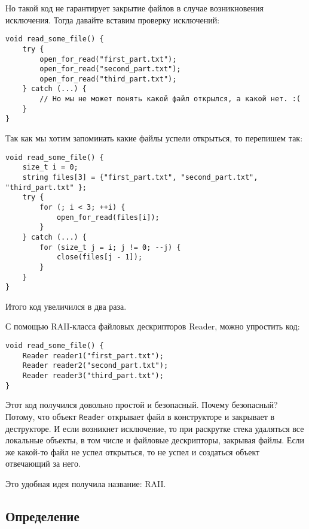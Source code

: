 
Но такой код не гарантирует закрытие файлов в случае возникновения исключения.
Тогда давайте вставим проверку исключений:
\begin{verbatim}
void read_some_file() {
    try {
        open_for_read("first_part.txt");
        open_for_read("second_part.txt");
        open_for_read("third_part.txt");
    } catch (...) {
        // Но мы не может понять какой файл открылся, а какой нет. :(
    }
}
\end{verbatim}

Так как мы хотим запоминать какие файлы успели открыться, то перепишем так:

\begin{verbatim}
void read_some_file() {
    size_t i = 0;
    string files[3] = {"first_part.txt", "second_part.txt", "third_part.txt" };
    try {
        for (; i < 3; ++i) {
            open_for_read(files[i]);
        }
    } catch (...) {
        for (size_t j = i; j != 0; --j) {
            close(files[j - 1]);
        }
    }
}
\end{verbatim}

Итого код увеличился в два раза.

С помощью RAII-класса файловых дескрипторов Reader, можно упростить код:

\begin{verbatim}
void read_some_file() {
    Reader reader1("first_part.txt");
    Reader reader2("second_part.txt");
    Reader reader3("third_part.txt");
}
\end{verbatim}

Этот код получился довольно простой и безопасный. Почему безопасный? Потому, что объект \texttt{Reader} открывает файл в конструкторе и закрывает в деструкторе. И если возникнет исключение, то при раскрутке стека удаляться все локальные объекты, в том числе и файловые дескрипторы, закрывая файлы. Если же какой-то файл не успел открыться, то не успел и создаться объект отвечающий за него.

Это удобная идея получила название: RAII.

\subsection{Определение}

